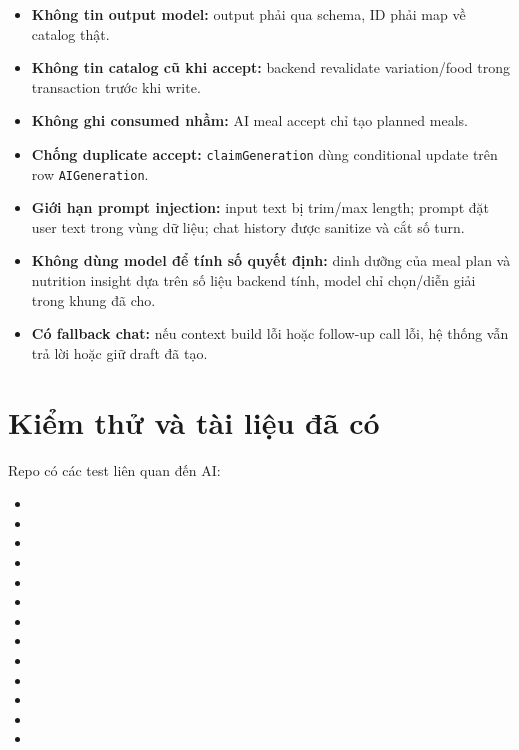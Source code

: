 \documentclass[12pt,a4paper]{article}
\newcommand{\code}[1]{\texttt{#1}}
\begin{document}
\begin{itemize}
  \item \textbf{Không tin output model:} output phải qua schema, ID phải map về catalog thật.
  \item \textbf{Không tin catalog cũ khi accept:} backend revalidate variation/food trong transaction trước khi write.
  \item \textbf{Không ghi consumed nhầm:} AI meal accept chỉ tạo planned meals.
  \item \textbf{Chống duplicate accept:} \code{claimGeneration} dùng conditional update trên row \code{AIGeneration}.
  \item \textbf{Giới hạn prompt injection:} input text bị trim/max length; prompt đặt user text trong vùng dữ liệu; chat history được sanitize và cắt số turn.
  \item \textbf{Không dùng model để tính số quyết định:} dinh dưỡng của meal plan và nutrition insight dựa trên số liệu backend tính, model chỉ chọn/diễn giải trong khung đã cho.
  \item \textbf{Có fallback chat:} nếu context build lỗi hoặc follow-up call lỗi, hệ thống vẫn trả lời hoặc giữ draft đã tạo.
\end{itemize}

\section{Kiểm thử và tài liệu đã có}

Repo có các test liên quan đến AI:

\begin{itemize}
  \item {}
  \item {}
  \item {}
  \item {}
  \item {}
  \item {}
  \item {}
  \item {}
  \item {}
  \item {}
  \item {}
  \item {}
  \item {}
\end{itemize}
\end{document}
